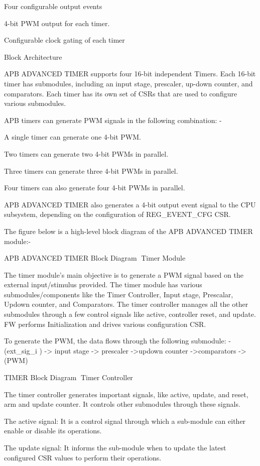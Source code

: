     Four configurable output events

    4-bit PWM output for each timer.

    Configurable clock gating of each timer

Block Architecture

APB ADVANCED TIMER supports four 16-bit independent Timers. Each 16-bit timer has submodules, including an input stage, prescaler, up-down counter, and comparators. Each timer has its own set of CSRs that are used to configure various submodules.

APB timers can generate PWM signals in the following combination: -

    A single timer can generate one 4-bit PWM.

    Two timers can generate two 4-bit PWMs in parallel.

    Three timers can generate three 4-bit PWMs in parallel.

    Four timers can also generate four 4-bit PWMs in parallel.

APB ADVANCED TIMER also generates a 4-bit output event signal to the CPU subsystem, depending on the configuration of REG_EVENT_CFG CSR.

The figure below is a high-level block diagram of the APB ADVANCED TIMER module:-

APB ADVANCED TIMER Block Diagram
Timer Module

The timer module’s main objective is to generate a PWM signal based on the external input/stimulus provided. The timer module has various submodules/components like the Timer Controller, Input stage, Prescalar, Updown counter, and Comparators. The timer controller manages all the other submodules through a few control signals like active, controller reset, and update. FW performs Initialization and drives various configuration CSR.

To generate the PWM, the data flows through the following submodule: - (ext_sig_i ) -> input stage -> prescaler ->updown counter ->comparators -> (PWM)

TIMER Block Diagram
Timer Controller

The timer controller generates important signals, like active, update, and reset, arm and update counter. It controls other submodules through these signals.

    The active signal: It is a control signal through which a sub-module can either enable or disable its operations.

    The update signal: It informs the sub-module when to update the latest configured CSR values to perform their operations.

